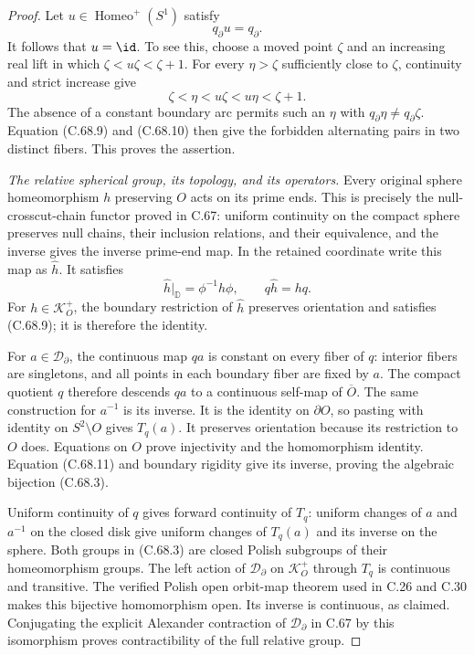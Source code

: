 \begin{proof}
Let $u\in\operatorname{Homeo}^+(S^1)$ satisfy
\[
                            q_\partial u=q_\partial .
                                                               \tag{C.68.9}
\]
It follows that $u=\id$. To see this, choose a
moved point $\zeta$ and an increasing real lift
in which $\zeta<u\zeta<\zeta+1$.
For every $\eta>\zeta$ sufficiently close to
$\zeta$, continuity and strict increase give
\[
                       \zeta<\eta<u\zeta<u\eta<\zeta+1 .
                                                               \tag{C.68.10}
\]
The absence of a constant boundary arc permits
such an $\eta$ with $q_\partial\eta\ne q_\partial\zeta$.
Equation (C.68.9) and (C.68.10) then give the
forbidden alternating pairs in two distinct
fibers. This proves the assertion.

\emph{The relative spherical group, its topology, and its operators.}
Every original sphere homeomorphism $h$ preserving
$O$ acts on its prime ends. This is precisely the
null-crosscut-chain functor proved in C.67:
uniform continuity on the compact sphere preserves
null chains, their inclusion relations, and their
equivalence, and the inverse gives the inverse
prime-end map. In the retained coordinate write
this map as $\widehat h$. It satisfies
\[
 \widehat h|_{\mathbb D}=\phi^{-1}h\phi,\qquad
                             q\widehat h=hq .
                                                               \tag{C.68.11}
\]
For $h\in\mathcal K_O^+$, the boundary restriction
of $\widehat h$ preserves orientation and satisfies
(C.68.9); it is therefore the identity.

For $a\in\mathcal D_\partial$, the continuous
map $qa$ is constant on every fiber of $q$:
interior fibers are singletons, and all points
in each boundary fiber are fixed by $a$.
The compact quotient $q$ therefore descends
$qa$ to a continuous self-map of $\overline O$.
The same construction for $a^{-1}$ is its inverse.
It is the identity on $\partial O$, so pasting
with identity on $S^2\setminus O$ gives $T_q(a)$.
It preserves orientation because its restriction
to $O$ does. Equations on $O$ prove injectivity
and the homomorphism identity. Equation (C.68.11)
and boundary rigidity give its inverse, proving
the algebraic bijection (C.68.3).

Uniform continuity of $q$ gives forward continuity
of $T_q$: uniform changes of $a$ and $a^{-1}$
on the closed disk give uniform changes of
$T_q(a)$ and its inverse on the sphere.
Both groups in (C.68.3) are closed Polish subgroups
of their homeomorphism groups. The left action
of $\mathcal D_\partial$ on $\mathcal K_O^+$
through $T_q$ is continuous and transitive.
The verified Polish open orbit-map theorem used
in C.26 and C.30 makes this bijective homomorphism
open. Its inverse is continuous, as claimed.
Conjugating the explicit Alexander contraction
of $\mathcal D_\partial$ in C.67 by this
isomorphism proves contractibility of the full
relative group.


\end{proof}
